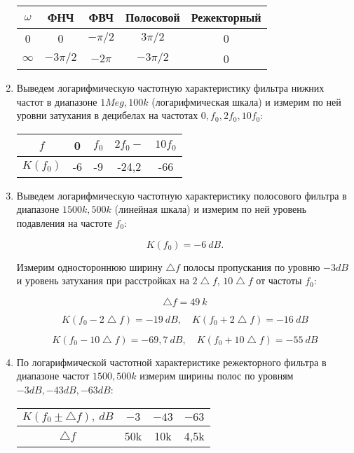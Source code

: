 \documentclass[a4paper, 12pt]{article}%
\begin{document}
\begin{enumerate}
\begin{center}
\begin{tabular}{|c|c|c|c|c|}
\hline 
$\omega$ & ФНЧ & ФВЧ & Полосовой & Режекторный \\ 
\hline 
0 & 0 & $-\pi/2$ & $3\pi/2$ & 0 \\ 
\hline 
$\infty$ & $-3\pi/2$ & $-2\pi$ & $-3\pi/2$ & 0 \\ 
\hline 
\end{tabular}
\end{center} 

\item Выведем логарифмическую частотную характеристику фильтра нижних частот в диапазоне $1Meg,100k$ (логарифмическая шкала) и измерим по ней уровни затухания в децибелах на частотах $0, f_0, 2f_0, 10f_0$:

\begin{center}
\begin{tabular}{|c|c|c|c|c|}
\hline 
$f$ & 0 & $f_0$ & $2f_0-$ & $10f_0$ \\ 
\hline 
$K(f_0)$ & -6 & -9 & -24,2 & -66 \\ 
\hline 
\end{tabular} 
\end{center}

\item Выведем логарифмическую частотную характеристику полосового фильтра в диапазоне $1500k,500k$ (линейная шкала) и измерим по ней уровень подавления на частоте $f_0$:

\[K(f_0) = -6 \: dB.\]

Измерим одностороннюю ширину $\bigtriangleup f$ полосы пропускания по уровню $-3 dB$ и уровень затухания при расстройках на $2\bigtriangleup f$, $10\bigtriangleup f$ от частоты $f_0$:

\[\bigtriangleup f = 49\: k\]

\[K(f_0 - 2\bigtriangleup f) = -19 \: dB, \quad K(f_0 + 2\bigtriangleup f) = -16 \: dB\]

\[K(f_0 - 10\bigtriangleup f) = -69,7 \: dB, \quad K(f_0 + 10\bigtriangleup f) = -55 \: dB\]

\item По логарифмической частотной характеристике режекторного фильтра в диапазоне частот $1500,500k$ измерим ширины полос по уровням $-3dB, -43dB, -63dB$:

\begin{center}
\begin{tabular}{|c|c|c|c|}
\hline 
$K(f_0 \pm \bigtriangleup f), \: dB$ & $-3$ & $-43$ & $-63$ \\ 
\hline 
$\bigtriangleup f$ & 50k & 10k & 4,5k \\ 
\hline 
\end{tabular} 
\end{center}

\end{enumerate}
\end{document}
